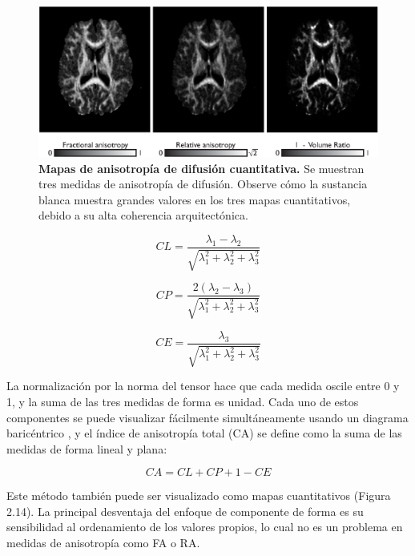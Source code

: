 \documentclass[12pt,a5,twoside]{book}
\begin{document}
\begin{figure}
	\centering
    \includegraphics [scale=1,center] {DTI_quantMaps_anisotropy.eps}
    \caption{\textbf{Mapas de anisotropía de difusión cuantitativa.} Se muestran tres medidas de anisotropía de difusión. Observe cómo la sustancia blanca muestra grandes valores en los tres mapas cuantitativos, debido a su alta coherencia arquitectónica.}
    \label{F:DTI_quantMaps_anisotropy}
\end{figure}

\begin{equation}
CL = \frac{\lambda_{1} - \lambda_{2}}{\sqrt{\lambda_1^2 + \lambda_2^2 + \lambda_3^2}}
\end{equation}

\begin{equation}
CP = \frac{2(\lambda_{2} - \lambda_{3})}{\sqrt{\lambda_1^2 + \lambda_2^2 + \lambda_3^2}}
\end{equation}

\begin{equation}
CE = \frac{\lambda_{3}}{\sqrt{\lambda_1^2 + \lambda_2^2 + \lambda_3^2}}
\end{equation}

La normalización por la norma del tensor hace que cada medida oscile entre 0 y 1, y la suma de las tres medidas de forma es unidad. Cada uno de estos componentes se puede visualizar fácilmente simultáneamente usando un diagrama baricéntrico \citep{Alexander_2000}, y el índice de anisotropía total (CA) se define como la suma de las medidas de forma lineal y plana:

\begin{equation}
CA = CL + CP + 1 - CE
\end{equation}

Este método también puede ser visualizado como mapas cuantitativos (Figura 2.14). La principal desventaja del enfoque de componente de forma es su sensibilidad al ordenamiento de los valores propios, lo cual no es un problema en medidas de anisotropía como FA o RA.
\end{document}
